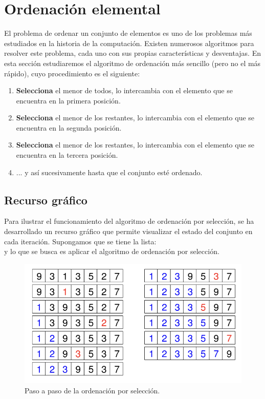 \section{Ordenación elemental}
El problema de ordenar un conjunto de elementos es uno de los problemas más estudiados en la historia de la computación. Existen numerosos algoritmos para resolver este problema, cada uno con sus propias características y desventajas. En esta sección estudiaremos el algoritmo de ordenación más sencillo (pero no el más rápido), cuyo procedimiento es el siguiente:

\begin{enumerate}
    \item \textbf{Selecciona} el menor de todos, lo intercambia con el elemento que se encuentra en la primera posición.
    \item \textbf{Selecciona} el menor de los restantes, lo intercambia con el elemento que se encuentra en la segunda posición. 
    \item \textbf{Selecciona} el menor de los restantes, lo intercambia con el elemento que se encuentra en la tercera posición. 
    \item ... y así sucesivamente hasta que el conjunto esté ordenado.  
\end{enumerate}

\subsection{Recurso gráfico}
Para ilustrar el funcionamiento del algoritmo de ordenación por selección, se ha desarrollado un recurso gráfico que permite visualizar el estado del conjunto en cada iteración. Supongamos que se tiene la lista:
\begin{equation*}
    [ \ 9,3,1,3,5,27 \ ]
\end{equation*}
y lo que se busca es aplicar el algoritmo de ordenación por selección.

\begin{figure}[H]
    \centering
    \includegraphics[scale=0.5]{./Images/oedef.png}
    \caption{Paso a paso de la ordenación por selección.}
\end{figure}



